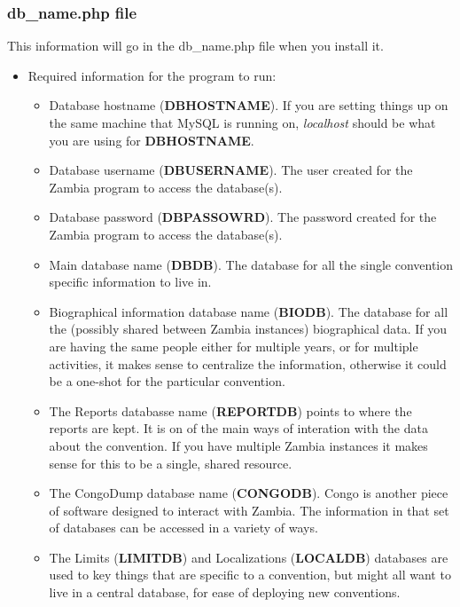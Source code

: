 \documentclass[tablesignature]{scrartcl}
\begin{document}
\subsubsection{db\_{}name.php file}
\label{sec-1_2_4}

    This information will go in the db\_{}name.php file when you install it.
\begin{itemize}

\item Required information for the program to run:
\label{sec-1_2_4_1}%
\begin{itemize}
\item Database hostname (\textbf{DBHOSTNAME}). If you are setting things up on
     the same machine that MySQL is running on, \emph{localhost} should be
     what you are using for \textbf{DBHOSTNAME}.
\item Database username (\textbf{DBUSERNAME}).  The user created for the
     Zambia program to access the database(s).
\item Database password (\textbf{DBPASSOWRD}).  The password created for the
     Zambia program to access the database(s).
\item Main database name (\textbf{DBDB}).  The database for all the single
     convention specific information to live in.
\item Biographical information database name (\textbf{BIODB}).  The database
     for all the (possibly shared between Zambia instances)
     biographical data.  If you are having the same people either for
     multiple years, or for multiple activities, it makes sense to
     centralize the information, otherwise it could be a one-shot for
     the particular convention.
\item The Reports databasse name (\textbf{REPORTDB}) points to where the
     reports are kept.  It is on of the main ways of interation with
     the data about the convention.  If you have multiple Zambia
     instances it makes sense for this to be a single, shared
     resource.
\item The CongoDump database name (\textbf{CONGODB}). Congo is another piece of
     software designed to interact with Zambia. The information in
     that set of databases can be accessed in a variety of ways.
\item The Limits (\textbf{LIMITDB}) and Localizations (\textbf{LOCALDB}) databases
     are used to key things that are specific to a convention, but
     might all want to live in a central database, for ease of
     deploying new conventions.

\end{itemize}
\end{itemize}
\end{document}
